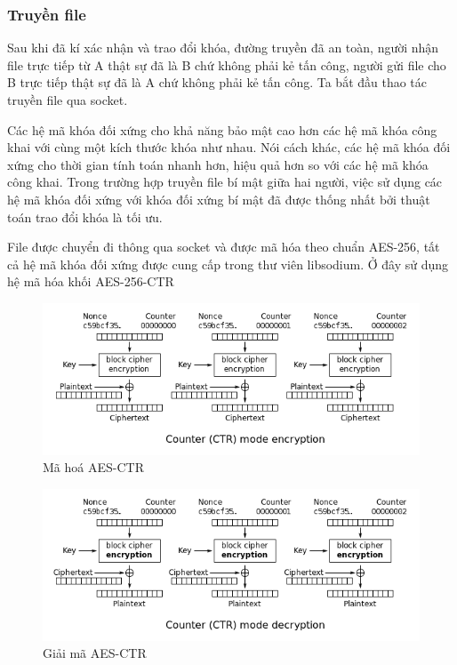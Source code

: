 \documentclass[a4paper,12pt]{report}
\begin{document}
\subsubsection*{Truyền file}
Sau khi đã kí xác nhận và trao đổi khóa, đường truyền đã an toàn, người nhận file trực tiếp từ A thật sự đã là B chứ không phải kẻ tấn công, người gửi file cho B trực tiếp thật sự
đã là A chứ không phải kẻ tấn công. Ta bắt đầu thao tác truyền file qua socket. 

Các hệ mã khóa đối xứng cho khả năng bảo mật cao hơn các hệ mã khóa công khai với cùng một kích thước khóa như nhau. Nói cách khác, các hệ mã khóa đối xứng cho thời gian tính toán nhanh hơn, hiệu quả hơn so với các hệ mã khóa công khai. Trong trường hợp truyền file bí mật giữa hai người, việc sử dụng các hệ mã khóa đối xứng với khóa đối xứng bí mật đã được thống nhất bởi thuật toán trao đổi khóa là tối ưu.

File được chuyển đi thông qua socket và được mã hóa theo chuẩn AES-256, tất cả hệ mã khóa đối xứng được cung cấp trong thư viên libsodium. Ở đây sử dụng hệ mã hóa khối AES-256-CTR
\begin{center}
\begin{figure}[H]
\includegraphics[width=0.9\linewidth]{../ctr-en.png}
\caption{Mã hoá AES-CTR}
\end{figure}
\end{center}
\begin{center}
\begin{figure}[H]
\includegraphics[width=0.9\linewidth]{../ctr-de.png}
\caption{Giải mã AES-CTR}
\end{figure}
\end{center}
\end{document}
